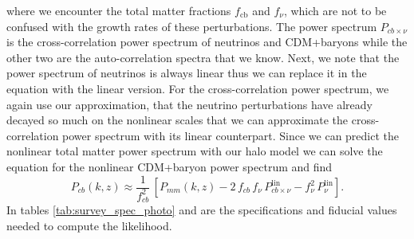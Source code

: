 \documentclass[oneside]{book}
\begin{document}
where we encounter the total matter fractions $f_\mathrm{cb}$ and $f_\nu$, which are not to be confused with the growth rates of these perturbations. The power spectrum $P_{cb\times\nu}$ is the cross-correlation power spectrum of neutrinos and CDM+baryons while the other two are the auto-correlation spectra that we know. Next, we note that the power spectrum of neutrinos is always linear thus we can replace it in the equation with the linear version. For the cross-correlation power spectrum, we again use our approximation, that the neutrino perturbations have already decayed so much on the nonlinear scales that we can approximate the cross-correlation power spectrum with its linear counterpart. Since we can predict the nonlinear total matter power spectrum with our halo model we can solve the equation for the nonlinear CDM+baryon power spectrum and find 
\begin{equation}
    P_{cb}(k,z) \approx \frac{1}{f_{cb}^2}\,\left[P_{mm}(k,z)-2\,f_{cb}\,f_\nu\,P^\mathrm{lin}_{cb\times\nu}-f_{\nu}^2\,P^\mathrm{lin}_{\nu}\right].
\end{equation}   
In tables \ref{tab:survey_spec_photo} and are the specifications and fiducial values needed to compute the likelihood.
\end{document}
